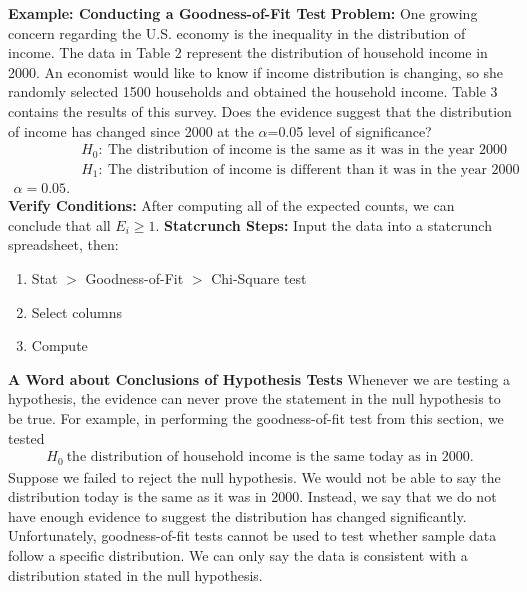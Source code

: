\documentclass{report}
\begin{document}
    \pagebreak 
    \bigbreak \noindent 
    \begin{mdframed}
      \textbf{Example: Conducting a Goodness-of-Fit Test}
      \bigbreak \noindent 
      \textbf{Problem:}
      One growing concern regarding the U.S. economy is the inequality in the distribution of income. The data in Table 2 represent the distribution of household income in 2000. An economist would like to know if income distribution is changing, so she randomly selected 1500 households and obtained the household income. Table 3 contains the results of this survey. Does the evidence suggest that the distribution of income has changed since 2000 at the $\alpha $=0.05 level of significance?
      \begin{align*}
          &H_{0}:\ \text{The distribution of income is the same as it was in the year 2000} \\
          &H_{1}:\ \text{The distribution of income is different than it was in the year 2000} \\ 
          \alpha = 0.05
      .\end{align*}
      \bigbreak \noindent 
      \textbf{Verify Conditions:}
      After computing all of the expected counts, we can conclude that all $E_{i}  \geq 1$.
      \bigbreak \noindent 
      \textbf{Statcrunch Steps:}
      Input the data into a statcrunch spreadsheet, then:
      \begin{enumerate}
          \item Stat $> $ Goodness-of-Fit $> $ Chi-Square test
            \item Select columns
            \item Compute
      \end{enumerate}


      
    \end{mdframed}

    \bigbreak \noindent \bigbreak \noindent 
    \textbf{A Word about Conclusions of Hypothesis Tests}
    \bigbreak \noindent 
    Whenever we are testing a hypothesis, the evidence can never prove the statement in the null hypothesis to be true. For example, in performing the goodness-of-fit test from this section, we tested
    \begin{align*}
        H_0\: \text{the distribution of household income is the same today as in 2000}
    .\end{align*}
    \bigbreak \noindent 
    Suppose we failed to reject the null hypothesis. We would not be able to say the distribution today is the same as it was in 2000. Instead, we say that we do not have enough evidence to suggest the distribution has changed significantly.
    \bigbreak \noindent 
    Unfortunately, goodness-of-fit tests cannot be used to test whether sample data follow a specific distribution. We can only say the data is consistent with a distribution stated in the null hypothesis.
\end{document}
